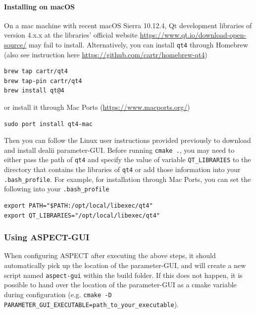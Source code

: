 \documentclass{article}
\newcommand{\aspect}{\textsc{ASPECT}}
\begin{document}
\paragraph{Installing on macOS} On a mac machine with recent macOS Sierra 10.12.4, Qt development libraries of version 4.x.x at the libraries' official website \url{https://www.qt.io/download-open-source/} may fail to install.  Alternatively, you can install \texttt{qt4} through Homebrew (also see instruction here \url{https://github.com/cartr/homebrew-qt4})
\begin{verbatim}
brew tap cartr/qt4
brew tap-pin cartr/qt4
brew install qt@4
\end{verbatim}
or install it through Mac Ports (\url{https://www.macports.org/})
\begin{verbatim}
sudo port install qt4-mac
\end{verbatim}
Then you can follow the Linux user instructions provided previously to download and install dealii parameter-GUI.
Before running \texttt{cmake .}, you may need to either pass the path of \texttt{qt4} and specify the value of variable \texttt{QT\_LIBRARIES} to the directory that contains the libraries of \texttt{qt4}
or add those information into your \texttt{.bash\_profile}. For example, for installation through Mac Ports, you can set the following into your \texttt{.bash\_profile}
\begin{verbatim}
export PATH="$PATH:/opt/local/libexec/qt4"
export QT_LIBRARIES="/opt/local/libexec/qt4"
\end{verbatim}




\subsubsection{Using \aspect{}-GUI}

When configuring \aspect{} after executing the above steps, it should automatically pick up the
location of the parameter-GUI, and will create a new script named \texttt{aspect-gui} within the build folder.
If this does not happen, it is possible to hand over the location of the parameter-GUI as a cmake
variable during configuration (e.g. \texttt{cmake -D PARAMETER\_GUI\_EXECUTABLE=path\_to\_your\_executable}).
\end{document}
